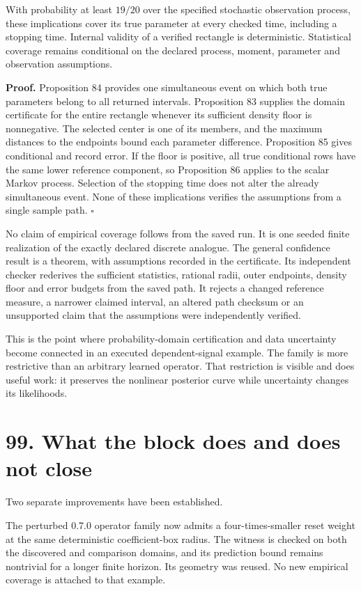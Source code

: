\documentclass[11pt,letterpaper]{article}
\begin{document}
With probability at least \(19/20\) over the specified stochastic
observation process, these implications cover its true parameter at
every checked time, including a stopping time. Internal validity of a
verified rectangle is deterministic. Statistical coverage remains
conditional on the declared process, moment, parameter and observation
assumptions.

\textbf{Proof.} Proposition 84 provides one simultaneous event on which
both true parameters belong to all returned intervals. Proposition 83
supplies the domain certificate for the entire rectangle whenever its
sufficient density floor is nonnegative. The selected center is one of
its members, and the maximum distances to the endpoints bound each
parameter difference. Proposition 85 gives conditional and record error.
If the floor is positive, all true conditional rows have the same lower
reference component, so Proposition 86 applies to the scalar Markov
process. Selection of the stopping time does not alter the already
simultaneous event. None of these implications verifies the assumptions
from a single sample path. \(\square\)

No claim of empirical coverage follows from the saved run. It is one
seeded finite realization of the exactly declared discrete analogue. The
general confidence result is a theorem, with assumptions recorded in the
certificate. Its independent checker rederives the sufficient
statistics, rational radii, outer endpoints, density floor and error
budgets from the saved path. It rejects a changed reference measure, a
narrower claimed interval, an altered path checksum or an unsupported
claim that the assumptions were independently verified.

This is the point where probability-domain certification and data
uncertainty become connected in an executed dependent-signal example.
The family is more restrictive than an arbitrary learned operator. That
restriction is visible and does useful work: it preserves the nonlinear
posterior curve while uncertainty changes its likelihoods.

\section{99. What the block does and does not
close}\label{what-the-block-does-and-does-not-close}

Two separate improvements have been established.

The perturbed 0.7.0 operator family now admits a four-times-smaller
reset weight at the same deterministic coefficient-box radius. The
witness is checked on both the discovered and comparison domains, and
its prediction bound remains nontrivial for a longer finite horizon. Its
geometry was reused. No new empirical coverage is attached to that
example.
\end{document}
